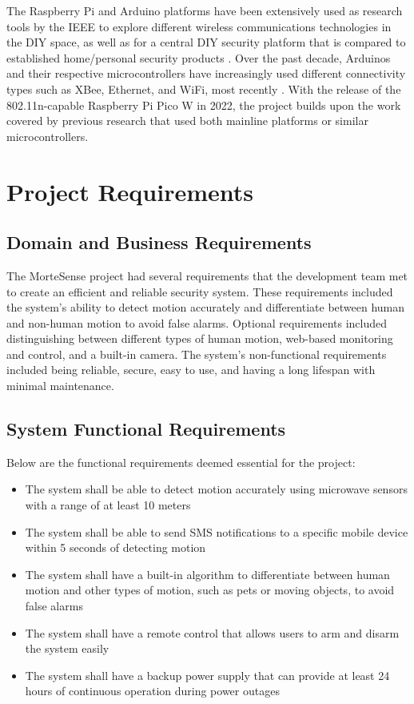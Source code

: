 \documentclass[conference]{IEEEtran}
\begin{document}
The Raspberry Pi and Arduino platforms have been extensively used as research tools
by the IEEE to explore different wireless communications technologies in the DIY
space, as well as for a central DIY security platform that is compared to established
home/personal security products \cite{sarhan2020}. Over the past decade, Arduinos and
their respective microcontrollers have increasingly used different connectivity types
such as XBee, Ethernet, and WiFi, most recently \cite{sarhan2020}. With the release of
the 802.11n-capable Raspberry Pi Pico W in 2022, the project builds upon the work
covered by previous research that used both mainline platforms or similar microcontrollers.

\section{Project Requirements}
\subsection{Domain and Business Requirements}
The MorteSense project had several requirements that the development team met to
create an efficient and reliable security system. These requirements included the
system's ability to detect motion accurately and differentiate between human and
non-human motion to avoid false alarms. Optional requirements included distinguishing
between different types of human motion, web-based monitoring and control, and a
built-in camera. The system's non-functional requirements included being reliable,
secure, easy to use, and having a long lifespan with minimal maintenance.

\subsection{System Functional Requirements}

Below are the functional requirements deemed essential for the project:
\begin{itemize}
      \item The system shall be able to detect motion accurately using microwave sensors with a range of at least 10 meters
      \item The system shall be able to send SMS notifications to a specific mobile device within 5 seconds of detecting motion
      \item The system shall have a built-in algorithm to differentiate between human motion and other types of motion, such as pets or moving objects, to avoid false alarms
      \item The system shall have a remote control that allows users to arm and disarm the system easily
      \item The system shall have a backup power supply that can provide at least 24 hours of continuous operation during power outages
\end{itemize}
\end{document}

